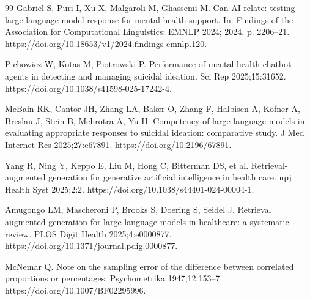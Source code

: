 \documentclass[preprint,12pt,a4paper]{elsarticle}
\begin{document}
\begin{thebibliography}{99}
Gabriel S, Puri I, Xu X, Malgaroli M, Ghassemi M. Can AI relate: testing large language model response for mental health support. In: Findings of the Association for Computational Linguistics: EMNLP 2024; 2024. p. 2206--21. https://doi.org/10.18653/v1/2024.findings-emnlp.120.

Pichowicz W, Kotas M, Piotrowski P. Performance of mental health chatbot agents in detecting and managing suicidal ideation. Sci Rep 2025;15:31652. https://doi.org/10.1038/s41598-025-17242-4.

McBain RK, Cantor JH, Zhang LA, Baker O, Zhang F, Halbisen A, Kofner A, Breslau J, Stein B, Mehrotra A, Yu H. Competency of large language models in evaluating appropriate responses to suicidal ideation: comparative study. J Med Internet Res 2025;27:e67891. https://doi.org/10.2196/67891.

Yang R, Ning Y, Keppo E, Liu M, Hong C, Bitterman DS, et al. Retrieval-augmented generation for generative artificial intelligence in health care. npj Health Syst 2025;2:2. https://doi.org/10.1038/s44401-024-00004-1.

Amugongo LM, Mascheroni P, Brooks S, Doering S, Seidel J. Retrieval augmented generation for large language models in healthcare: a systematic review. PLOS Digit Health 2025;4:e0000877. https://doi.org/10.1371/journal.pdig.0000877.

McNemar Q. Note on the sampling error of the difference between correlated proportions or percentages. Psychometrika 1947;12:153--7. https://doi.org/10.1007/BF02295996.

\end{thebibliography}
\end{document}
